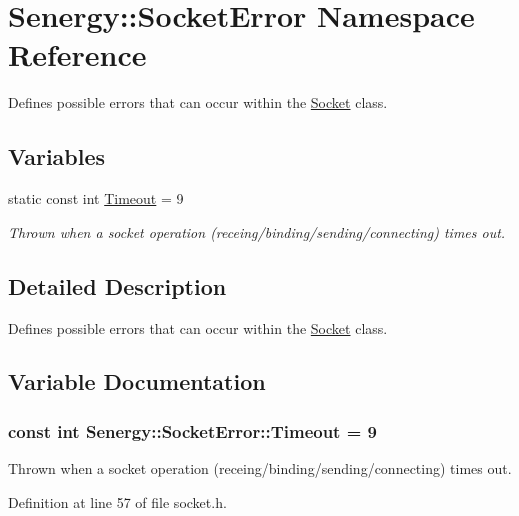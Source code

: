 \hypertarget{namespace_senergy_1_1_socket_error}{\section{Senergy\-:\-:Socket\-Error Namespace Reference}
\label{namespace_senergy_1_1_socket_error}
}


Defines possible errors that can occur within the \hyperlink{class_senergy_1_1_socket}{Socket} class.  


\subsection*{Variables}
\begin{DoxyCompactItemize}
\item 
static const int \hyperlink{namespace_senergy_1_1_socket_error_aa78be48fe668e1748c69b145a3c3fe16}{Timeout} = 9
\begin{DoxyCompactList}\small\item\em Thrown when a socket operation (receing/binding/sending/connecting) times out. \end{DoxyCompactList}\end{DoxyCompactItemize}


\subsection{Detailed Description}
Defines possible errors that can occur within the \hyperlink{class_senergy_1_1_socket}{Socket} class. 

\subsection{Variable Documentation}
\hypertarget{namespace_senergy_1_1_socket_error_aa78be48fe668e1748c69b145a3c3fe16}{
\subsubsection[{Timeout}]{\setlength{\rightskip}{0pt plus 5cm}const int Senergy\-::\-Socket\-Error\-::\-Timeout = 9\hspace{0.3cm}{\ttfamily [static]}}}\label{namespace_senergy_1_1_socket_error_aa78be48fe668e1748c69b145a3c3fe16}


Thrown when a socket operation (receing/binding/sending/connecting) times out. 



Definition at line 57 of file socket.\-h.

